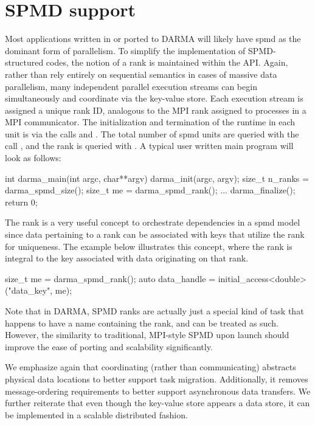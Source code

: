 
\section{SPMD support}
\label{sec:spmd}
Most applications written in or ported to DARMA will likely have \gls{spmd} as
the dominant form of parallelism.
To simplify the implementation of SPMD-structured codes, the notion of 
a \gls{rank} is maintained within the \gls{API}.   
Again, rather than rely entirely on sequential semantics in cases of massive data parallelism,
many independent parallel execution streams can begin simultaneously and coordinate via the key-value store.
Each execution stream is assigned a unique rank ID, analogous to the MPI rank assigned to processes in a MPI communicator.
The initialization and termination of the runtime in each unit 
is via the calls  and . 
The total number of \gls{spmd} units are queried with the call ,
and the rank is queried with . A typical user 
written main program will look as follows:
\begin{CppCode}
int darma_main(int argc, char**argv){
  darma_init(argc, argv);
  size_t n_ranks = darma_spmd_size();
  size_t me = darma_spmd_rank();
  ...
  darma_finalize();
  return 0;
}
\end{CppCode}

The rank is a very useful concept to orchestrate dependencies in a \gls{spmd}
model since data pertaining to a rank can be associated with keys that utilize
the rank for uniqueness. The example below illustrates this concept, where
the rank is integral to the key associated with data originating on that rank.
\begin{CppCode}
size_t me = darma_spmd_rank();
auto data_handle = initial_access<double>("data_key", me);
\end{CppCode}  
Note that in DARMA, SPMD ranks are actually just a special kind of task that
happens to have a name containing the rank, and can be treated as such. 
However, the similarity to traditional, MPI-style SPMD upon launch should improve the ease of porting and scalability significantly.

We emphasize again that coordinating (rather than communicating) abstracts physical data locations to better support task migration.
Additionally, it removes message-ordering requirements to better support asynchronous data transfers.
We further reiterate that even though the key-value store appears a data store,
it can be implemented in a scalable distributed fashion.

